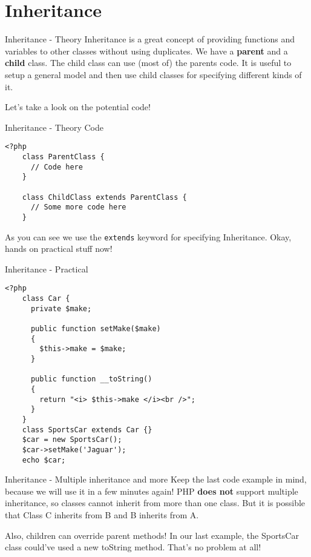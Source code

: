 \section{Inheritance}

\begin{frame}{Inheritance - Theory}
	Inheritance is a great concept of providing functions and variables to other classes without using duplicates. \pause We have a \textbf{parent} and a \textbf{child} class. The child class can use (most of) the parents code. It is useful to setup a general model and then use child classes for specifying different kinds of it.\pause
	
	Let's take a look on the potential code!
\end{frame}

\begin{frame}[fragile]{Inheritance - Theory Code}
	\begin{lstlisting}
<?php
	class ParentClass {
	  // Code here
	}
 
	class ChildClass extends ParentClass {
	  // Some more code here
	}
	\end{lstlisting}
	\pause As you can see we use the \texttt{extends} keyword for specifying Inheritance. \pause Okay, hands on practical stuff now!
\end{frame}

\begin{frame}[fragile]{Inheritance - Practical}
	\begin{lstlisting}
<?php
    class Car {
      private $make;
 
      public function setMake($make)
      {
        $this->make = $make;
      }
  
      public function __toString()
      {
        return "<i> $this->make </i><br />";
      }
    }
    class SportsCar extends Car {} 
    $car = new SportsCar();
    $car->setMake('Jaguar');
  	echo $car;
	\end{lstlisting}
\end{frame}

\begin{frame}[fragile]{Inheritance - Multiple inheritance and more}
	Keep the last code example in mind, because we will use it in a few minutes again! \pause
	PHP \textbf{does not} support multiple inheritance, so classes cannot inherit from more than one class. But it is possible that Class C inherits from B and B inherits from A.\pause
	
	Also, children can override parent methods! In our last example, the SportsCar class could've used a new toString method. That's no problem at all!\pause
\end{frame}

